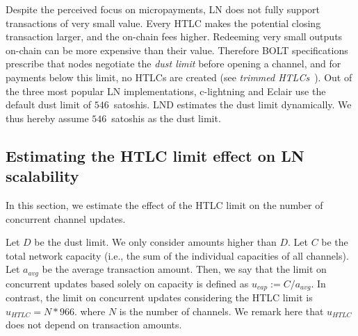 Despite the perceived focus on micropayments, LN does not fully support transactions of very small value.
Every HTLC makes the potential closing transaction larger, and the on-chain fees higher.
Redeeming very small outputs on-chain can be more expensive than their value.
Therefore BOLT specifications prescribe that nodes negotiate the \textit{dust limit} before opening a channel, and for payments below this limit, no HTLCs are created (see \textit{trimmed HTLCs}~\cite{BOLT3Trimmed}).
Out of the three most popular LN implementations, c-lightning and Eclair use the default dust limit of $546$~satoshis.
LND estimates the dust limit dynamically.
We thus hereby assume $546$~satoshis as the dust limit.



\subsection{Estimating the HTLC limit effect on LN scalability}	\label{estimating-concurrent channel updates}

In this section, we estimate the effect of the HTLC limit on the number of concurrent channel updates.



Let $D$ be the dust limit.
We only consider amounts higher than $D$.
Let $C$ be the total network capacity (i.e., the sum of the individual capacities of all channels).
Let $a_\textit{avg}$ be the average transaction amount. 
Then, we say that the limit on concurrent updates based solely on capacity is defined as   
$u_\textit{cap} := C / a_\textit{avg}$.
In contrast, the limit on concurrent updates 
considering the HTLC limit is $u_\textit{HTLC} = N * 966$.
where $N$ is the number of channels. We remark here that $u_\textit{HTLC}$ does not depend on transaction amounts.


